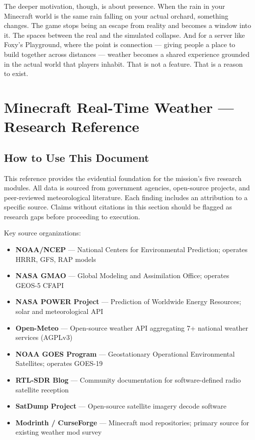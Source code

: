 \documentclass[11pt,letterpaper]{article}
\newcommand{\stageheader}[2]{%
  \noindent\colorbox{#2}{\makebox[\textwidth][l]{%
    \textcolor{white}{\bfseries\sffamily\hspace{6pt}#1\hspace{6pt}}}}%
  \vspace{0.5em}\par%
}
\begin{document}
The deeper motivation, though, is about presence. When the rain in your Minecraft world is the same rain falling on your actual orchard, something changes. The game stops being an escape from reality and becomes a window into it. The spaces between the real and the simulated collapse. And for a server like Foxy's Playground, where the point is connection --- giving people a place to build together across distances --- weather becomes a shared experience grounded in the actual world that players inhabit. That is not a feature. That is a reason to exist.

\newpage

\stageheader{STAGE 2 --- RESEARCH REFERENCE}{secondary}

\section{Minecraft Real-Time Weather --- Research Reference}

\subsection{How to Use This Document}

This reference provides the evidential foundation for the mission's five research modules. All data is sourced from government agencies, open-source projects, and peer-reviewed meteorological literature. Each finding includes an attribution to a specific source. Claims without citations in this section should be flagged as research gaps before proceeding to execution.

Key source organizations:

\begin{itemize}[noitemsep]
  \item \textbf{NOAA/NCEP} --- National Centers for Environmental Prediction; operates HRRR, GFS, RAP models
  \item \textbf{NASA GMAO} --- Global Modeling and Assimilation Office; operates GEOS-5 CFAPI
  \item \textbf{NASA POWER Project} --- Prediction of Worldwide Energy Resources; solar and meteorological API
  \item \textbf{Open-Meteo} --- Open-source weather API aggregating 7+ national weather services (AGPLv3)
  \item \textbf{NOAA GOES Program} --- Geostationary Operational Environmental Satellites; operates GOES-19
  \item \textbf{RTL-SDR Blog} --- Community documentation for software-defined radio satellite reception
  \item \textbf{SatDump Project} --- Open-source satellite imagery decode software
  \item \textbf{Modrinth / CurseForge} --- Minecraft mod repositories; primary source for existing weather mod survey
\end{itemize}
\end{document}
